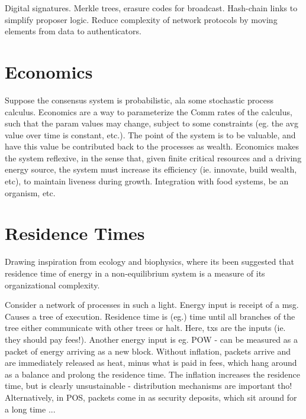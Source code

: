 Digital signatures.
Merkle trees, erasure codes for broadcast.
Hash-chain links to simplify proposer logic.
Reduce complexity of network protocols by moving elements from data to authenticators.

\section{Economics}
Suppose the consensus system is probabilistic, ala some stochastic process calculus.
Economics are a way to parameterize the Comm rates of the calculus,
such that the param values may change, subject to some constraints 
(eg. the avg value over time is constant, etc.).
The point of the system is to be valuable,
and have this value be contributed back to the processes as wealth.
Economics makes the system reflexive, in the sense that,
given finite critical resources and a driving energy source,
the system must increase its efficiency (ie. innovate, build wealth, etc),
to maintain liveness during growth.
Integration with food systems, be an organism, etc.

\section{Residence Times}
Drawing inspiration from ecology and biophysics, 
where its been suggested that residence time of energy in a non-equilibrium system is a 
measure of its organizational complexity.

Consider a network of processes in such a light.
Energy input is receipt of a msg. 
Causes a tree of execution. 
Residence time is (eg.) time until all branches of the tree either communicate with other trees or halt.
Here, txs are the inputs (ie. they should pay fees!).
Another energy input is eg. POW - can be measured as a packet of energy arriving as a new block.
Without inflation, packets arrive and are immediately released as heat, minus what is paid in fees,
which hang around as a balance and prolong the residence time.
The inflation increases the residence time, but is clearly unsustainable - distribution mechanisms are important tho!
Alternatively, in POS, packets come in as security deposits, which sit around for a long time ...
